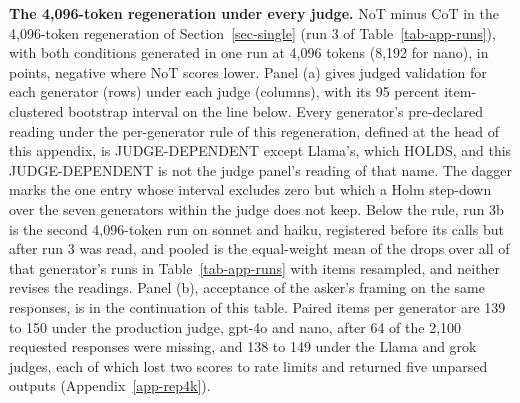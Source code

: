 \begin{table}[p]
\centering
\small
\caption{\textbf{The 4,096-token regeneration under every judge.}
NoT minus CoT in the 4,096-token regeneration of
Section~\ref{sec-single} (run 3 of Table~\ref{tab-app-runs}), with both
conditions generated in one run at 4,096 tokens (8,192 for nano), in points,
negative where NoT scores lower. Panel (a) gives judged validation for each
generator (rows) under each judge (columns), with its 95 percent
item-clustered bootstrap interval on the line below. Every generator's
pre-declared reading under the per-generator rule of this regeneration,
defined at the head of this appendix, is JUDGE-DEPENDENT except Llama's,
which HOLDS, and this JUDGE-DEPENDENT is not the judge panel's reading of
that name. The dagger marks the one entry whose interval excludes zero but
which a Holm step-down over the seven generators within the judge does not
keep. Below the rule, run 3b is the second 4,096-token run on sonnet and
haiku, registered before its calls but after run 3 was read, and pooled is
the equal-weight mean of the drops over all of that generator's runs in
Table~\ref{tab-app-runs} with items resampled, and neither revises the
readings. Panel (b), acceptance of the asker's framing on the same
responses, is in the continuation of this table. Paired items per
generator are 139 to 150 under the production judge, gpt-4o and nano, after
64 of the 2,100 requested responses were missing, and 138 to 149 under the
Llama and grok judges, each of which lost two scores to rate limits and
returned five unparsed outputs (Appendix~\ref{app-rep4k}).}

\end{table}

